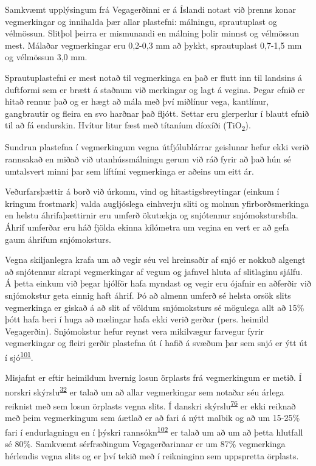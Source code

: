 \documentclass[icelandic,]{book}
\begin{document}
Samkvæmt upplýsingum frá Vegagerðinni er á Íslandi notast við þrenns konar vegmerkingar og innihalda þær allar plastefni: málningu, sprautuplast og vélmössun. Slitþol þeirra er mismunandi en málning þolir minnst og vélmössun mest. Málaðar vegmerkingar eru 0,2-0,3 mm að þykkt, sprautuplast 0,7-1,5 mm og vélmössun 3,0 mm.

Sprautuplastefni er mest notað til vegmerkinga en það er flutt inn til landsins á duftformi sem er brætt á staðnum við merkingar og lagt á vegina. Þegar efnið er hitað rennur það og er hægt að mála með því miðlínur vega, kantlínur, gangbrautir og fleira en svo harðnar það fljótt. Settar eru glerperlur í blautt efnið til að fá endurskin. Hvítur litur fæst með títaníum díoxíði (TiO\textsubscript{2}).

Sundrun plastefna í vegmerkingum vegna útfjólublárrar geislunar hefur ekki verið rannsakað en miðað við utanhússmálningu gerum við ráð fyrir að það hún sé umtalsvert minni þar sem líftími vegmerkinga er aðeins um eitt ár.

Veðurfarsþættir á borð við úrkomu, vind og hitastigsbreytingar (einkum í kringum frostmark) valda augljóslega einhverju sliti og molnun yfirborðsmerkinga en helstu áhrifaþættirnir eru umferð ökutækja og snjótennur snjómokstursbíla. Áhrif umferðar eru háð fjölda ekinna kílómetra um vegina en vert er að gefa gaum áhrifum snjómoksturs.

Vegna skiljanlegra krafa um að vegir séu vel hreinsaðir af snjó er nokkuð algengt að snjótennur skrapi vegmerkingar af vegum og jafnvel hluta af slitlaginu sjálfu. Á þetta einkum við þegar hjólför hafa myndast og vegir eru ójafnir en aðferðir við snjómokstur geta einnig haft áhrif. Þó að almenn umferð sé helsta orsök slits vegmerkinga er giskað á að slit af völdum snjómoksturs sé mögulega allt að 15\% þótt hafa beri í huga að mælingar hafa ekki verið gerðar (pers. heimild Vegagerðin). Snjómokstur hefur reynst vera mikilvægur farvegur fyrir vegmerkingar og fleiri gerðir plastefna út í hafið á svæðum þar sem snjó er ýtt út í sjó\textsuperscript{\protect\hyperlink{ref-BaztanJ2018}{101}}.

Misjafnt er eftir heimildum hvernig losun örplasts frá vegmerkingum er metið. Í norskri skýrslu\textsuperscript{\protect\hyperlink{ref-sundt2014sources}{32}} er talað um að allar vegmerkingar sem notaðar séu árlega reiknist með sem losun örplasts vegna slits. Í danskri skýrslu\textsuperscript{\protect\hyperlink{ref-lassen2015microplastics}{76}} er ekki reiknað með þeim vegmerkingum sem áætlað er að fari á nýtt malbik og að um 15-25\% fari í endurlagningu en í þýskri rannsókn\textsuperscript{\protect\hyperlink{ref-Commission2009}{102}} er talað um að um að þetta hlutfall sé 80\%. Samkvæmt sérfræðingum Vegagerðarinnar er um 87\% vegmerkinga hérlendis vegna slits og er því tekið með í reikninginn sem uppspretta örplasts.
\end{document}
